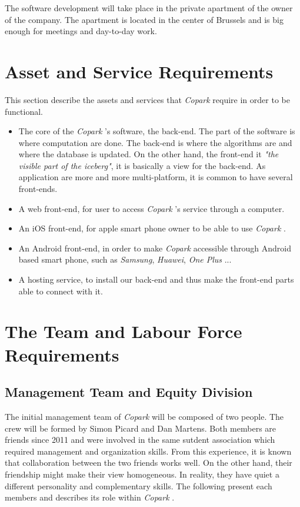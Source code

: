 \documentclass[12pt,a4paper,oneside]{book}
\newcommand{\bp}{\textit{Copark }}
\begin{document}
The software development will take place in the private apartment of the owner of the company. The apartment is located in the center of Brussels and is big enough for meetings and day-to-day work.\\

\section{Asset and Service Requirements}
This section describe the assets and services that \bp require in order to be functional.

\begin{itemize}
\item The core of the \bp's software, the back-end. The part of the software is where computation are done. The back-end is where the algorithms are and where the database is updated. On the other hand, the front-end it \textit{"the visible part of the iceberg"}, it is basically a view for the back-end. As application are more and more multi-platform, it is common to have several front-ends.

\item A web front-end, for user to access \bp's service through a computer.

\item An iOS front-end, for apple smart phone owner to be able to use \bp.

\item An Android front-end, in order to make \bp accessible through Android based smart phone, such as \textit{Samsung}, \textit{Huawei}, \textit{One Plus} ...

\item A hosting service, to install our back-end and thus make the front-end parts able to connect with it.
\end{itemize}

\section{The Team and Labour Force Requirements}
\subsection{Management Team and Equity Division}
The initial management team of \bp will be composed of two people. The crew will be formed by Simon Picard and Dan Martens. Both members are friends since 2011 and were involved in the same sutdent association which required management and organization skills. From this experience, it is known that collaboration between the two friends works well. On the other hand, their friendship might make their view homogeneous. In reality, they have quiet a different personality and complementary skills. The following present each members and describes its role within \bp.\\
\end{document}
